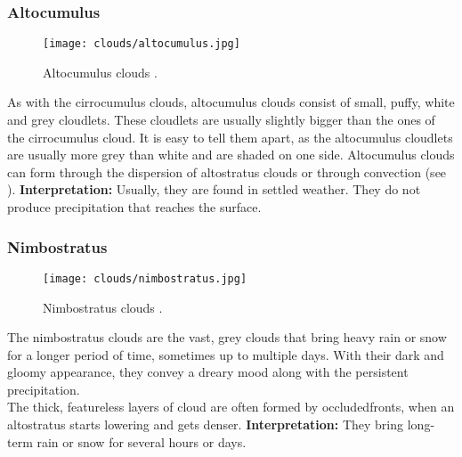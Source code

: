 \subsubsection{Altocumulus}
\begin{wrapfigure}[9]{r}{6cm}
    \vspace{-\baselineskip}
    \texttt{[image: clouds/altocumulus.jpg]}
    \caption{Altocumulus clouds \protect\cite{cloudtypes:wiki:altocumulus}.}
    \label{img:clouds:altocumulus}
\end{wrapfigure}
As with the cirrocumulus clouds, altocumulus clouds consist of small, puffy, white and grey \gls{cloudlet}s.
These \gls{cloudlet}s are usually slightly bigger than the ones of the cirrocumulus cloud.
It is easy to tell them apart, as the altocumulus \gls{cloudlet}s are usually more grey than white and are shaded on one side.
Altocumulus clouds can form through the dispersion of altostratus clouds or through \gls{convection} (see ).
\emptyline
\textbf{Interpretation:}
Usually, they are found in settled weather. They do not produce \gls{precipitation} that reaches the surface.


\subsubsection{Nimbostratus}
\begin{wrapfigure}[10]{r}{6cm}
    \vspace{-\baselineskip}
    \texttt{[image: clouds/nimbostratus.jpg]}
    \caption{Nimbostratus clouds \protect\cite{cloudtypes:wiki:nimbostratus}.}
    \label{img:clouds:nimbostratus}
\end{wrapfigure}
The nimbostratus clouds are the vast, grey clouds that bring heavy rain or snow for a longer period of time, sometimes up to multiple days.
With their dark and gloomy appearance, they convey a dreary mood along with the persistent \gls{precipitation}.
\\
The thick, featureless layers of cloud are often formed by \gls{occludedfront}s, when an altostratus starts lowering and gets denser.
\emptyline
\textbf{Interpretation:}
They bring long-term rain or snow for several hours or days.